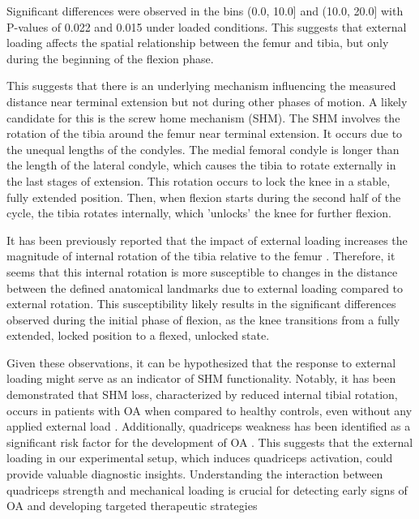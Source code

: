 \documentclass{micro-econ-thesis}
\begin{document}
Significant differences were observed in the bins (0.0, 10.0] and (10.0, 20.0] with P-values of 0.022 and 0.015 under loaded conditions. This suggests that external loading affects the spatial relationship between the femur and tibia, but only during the beginning of the flexion phase. 

This suggests that there is an underlying mechanism influencing the measured distance near terminal extension but not during other phases of motion. A likely candidate for this is the screw home mechanism (SHM). The SHM involves the rotation of the tibia around the femur near terminal extension. It occurs due to the unequal lengths of the condyles. The medial femoral condyle is longer than the length of the lateral condyle, which causes the tibia to rotate externally in the last stages of extension.  \parencite{kim_screw-home_2015} This rotation occurs to lock the knee in a stable, fully extended position. Then, when flexion starts during the second half of the cycle, the tibia rotates internally, which 'unlocks' the knee for further flexion.

It has been previously reported that the impact of external loading increases the magnitude of internal rotation of the tibia relative to the femur \parencite{myers_vivo_2012}. Therefore, it seems that this internal rotation is more susceptible to changes in the distance between the defined anatomical landmarks due to external loading compared to external rotation. This susceptibility likely results in the significant differences observed during the initial phase of flexion, as the knee transitions from a fully extended, locked position to a flexed, unlocked state.  

Given these observations, it can be hypothesized that the response to external loading might serve as an indicator of SHM functionality. Notably, it has been demonstrated that SHM loss, characterized by reduced internal tibial rotation, occurs in patients with OA when compared to healthy controls, even without any applied external load \parencite{jeon_alteration_2020}. Additionally, quadriceps weakness has been identified as a significant risk factor for the development of OA \parencite{segal_is_2011}. This suggests that the external loading in our experimental setup, which induces quadriceps activation, could provide valuable diagnostic insights. Understanding the interaction between quadriceps strength and mechanical loading is crucial for detecting early signs of OA and developing targeted therapeutic strategies
\end{document}
